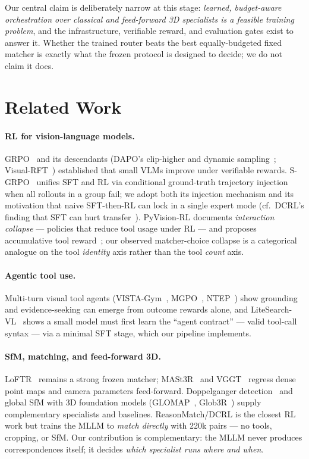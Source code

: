 \documentclass[10pt,twocolumn,letterpaper]{article}
\begin{document}
Our central claim is deliberately narrow at this stage: \emph{learned,
budget-aware orchestration over classical and feed-forward 3D specialists
is a feasible training problem}, and the infrastructure, verifiable reward,
and evaluation gates exist to answer it. Whether the trained router beats
the best equally-budgeted fixed matcher is exactly what the frozen protocol
is designed to decide; we do not claim it does.

\section{Related Work}
\label{sec:related}

\paragraph{RL for vision-language models.}
GRPO~\cite{grpo} and its descendants (DAPO's clip-higher and dynamic
sampling~\cite{dapo}; Visual-RFT~\cite{visualrft}) established that small
VLMs improve under verifiable rewards. S-GRPO~\cite{sgrpo} unifies SFT and
RL via conditional ground-truth trajectory injection when all rollouts in
a group fail; we adopt both its injection mechanism and its motivation
that naive SFT-then-RL can lock in a single expert mode (cf.\ DCRL's
finding that SFT can hurt transfer~\cite{reasonmatch}). PyVision-RL
documents \emph{interaction collapse} — policies that reduce tool usage
under RL — and proposes accumulative tool reward~\cite{pyvisionrl}; our
observed matcher-choice collapse is a categorical analogue on the tool
\emph{identity} axis rather than the tool \emph{count} axis.

\paragraph{Agentic tool use.}
Multi-turn visual tool agents (VISTA-Gym~\cite{vista}, MGPO~\cite{mgpo},
NTEP~\cite{ntep}) show grounding and evidence-seeking can emerge from
outcome rewards alone, and LiteSearch-VL~\cite{litesearch} shows a small
model must first learn the ``agent contract'' — valid tool-call syntax —
via a minimal SFT stage, which our pipeline implements.

\paragraph{SfM, matching, and feed-forward 3D.}
LoFTR~\cite{loftr} remains a strong frozen matcher; MASt3R~\cite{mast3r}
and VGGT~\cite{vggt} regress dense point maps and camera parameters
feed-forward. Doppelganger detection~\cite{doppelgangerspp,xdg} and global
SfM with 3D foundation models (GLOMAP~\cite{glomap}, Glob3R~\cite{glob3r})
supply complementary specialists and baselines. ReasonMatch/DCRL
\cite{reasonmatch} is the closest RL work but trains the MLLM to
\emph{match directly} with 220k pairs — no tools, cropping, or SfM. Our
contribution is complementary: the MLLM never produces correspondences
itself; it decides \emph{which specialist runs where and when}.
\end{document}
